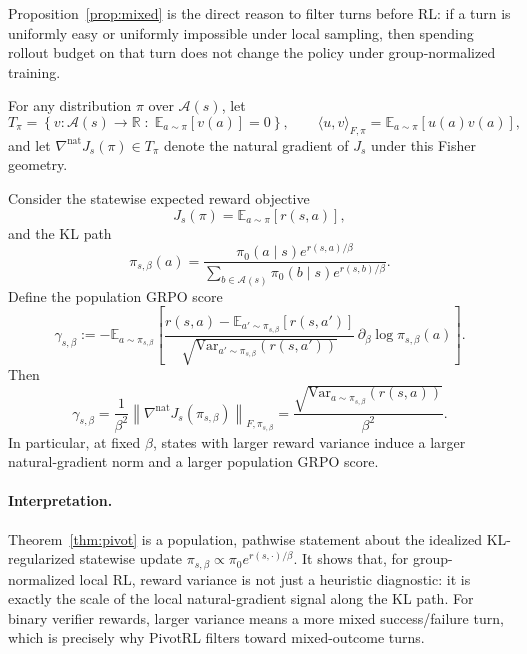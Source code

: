Proposition~\ref{prop:mixed} is the direct reason to filter turns before RL: if a turn is uniformly easy or uniformly impossible under local sampling, then spending rollout budget on that turn does not change the policy under group-normalized training.

For any distribution $\pi$ over $\mathcal{A}(s)$, let
\[
T_\pi
=
\left\{
v:\mathcal{A}(s)\to\mathbb{R}
\;:\;
\mathbb{E}_{a\sim\pi}[v(a)]=0
\right\},
\qquad
\langle u,v\rangle_{F,\pi}
=
\mathbb{E}_{a\sim\pi}[u(a)v(a)],
\]
and let $\nabla^{\mathrm{nat}}J_s(\pi)\in T_\pi$ denote the natural gradient of $J_s$ under this Fisher geometry.

\begin{theorem}
\label{thm:pivot}
Consider the statewise expected reward objective
\[
J_s(\pi)=\mathbb{E}_{a\sim\pi}[r(s,a)],
\]
and the KL path
\[
\pi_{s,\beta}(a)
=
\frac{
\pi_0(a\mid s)e^{r(s,a)/\beta}
}{
\sum_{b\in \mathcal{A}(s)} \pi_0(b\mid s)e^{r(s,b)/\beta}
}.
\]
Define the population GRPO score
\begin{equation}
\gamma_{s,\beta}
:=
-
\mathbb{E}_{a\sim \pi_{s,\beta}}
\left[
\frac{
r(s,a)-\mathbb{E}_{a'\sim\pi_{s,\beta}}[r(s,a')]
}{
\sqrt{\mathrm{Var}_{a'\sim\pi_{s,\beta}}(r(s,a'))}
}
\,\partial_\beta \log \pi_{s,\beta}(a)
\right].
\label{eq:grpo_score}
\end{equation}
Then
\begin{equation}
\gamma_{s,\beta}
=
\frac{1}{\beta^2}
\left\|
\nabla^{\mathrm{nat}}J_s(\pi_{s,\beta})
\right\|_{F,\pi_{s,\beta}}
=
\frac{
\sqrt{\mathrm{Var}_{a\sim\pi_{s,\beta}}(r(s,a))}
}{\beta^2}.
\label{eq:pivot_theorem}
\end{equation}
In particular, at fixed $\beta$, states with larger reward variance induce a larger natural-gradient norm and a larger population GRPO score.
\end{theorem}

\paragraph{Interpretation.}
Theorem~\ref{thm:pivot} is a population, pathwise statement about the idealized KL-regularized statewise update $\pi_{s,\beta}\propto \pi_0 e^{r(s,\cdot)/\beta}$. It shows that, for group-normalized local RL, reward variance is not just a heuristic diagnostic: it is exactly the scale of the local natural-gradient signal along the KL path. For binary verifier rewards, larger variance means a more mixed success/failure turn, which is precisely why PivotRL filters toward mixed-outcome turns.

